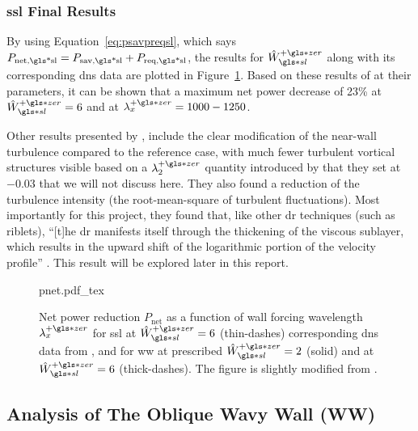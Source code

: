 \subsubsection{\gls*{ssl} Final Results}
By using Equation~\eqref{eq:psavpreqsl}, which says $P_\text{net,\gls*{sl}}=P_\text{sav,\gls*{sl}}+P_\text{req,\gls*{sl}} $, the results for $\hat{W}\pz\ssl$ along with its corresponding \gls*{dns} data are plotted in Figure~\ref{fig:pnet}. Based on these results of \textcite{viotti2009} at their parameters, it can be shown that a maximum net power decrease of 23\% at $\hat{W}\pz\ssl=6$ and at $\lambda_x\pz=1000-1250$.

Other results presented by \textcite{viotti2009}, include the clear modification of the near-wall turbulence compared to the reference case, with much fewer turbulent vortical structures visible based on a $\lambda_2\pz$ quantity introduced by \textcite{jeong1995} that they set at $-0.03$ that we will not discuss here. They also found a reduction of the turbulence intensity (the root-mean-square of turbulent fluctuations). Most importantly for this project, they found that, like other \gls*{dr} techniques (such as riblets), ``[t]he \gls*{dr} manifests itself through the thickening of the viscous sublayer, which results in the upward shift of the logarithmic portion of the velocity profile'' \cite{viotti2009}. This result will be explored later in this report. %

\begin{figure}[htbp]
	\centering
	\def\svgwidth{0.7\textwidth}
	{pnet.pdf_tex}
	\caption[$P_\text{net} $ for SSL and WW as a function of wall forcing wavelength $\lambda_x\pz$]{Net power reduction $P_\text{net}$ as a function of wall forcing wavelength $\lambda_x\pz$ for \gls*{ssl} at $\hat{W}\pz\ssl=6$ (thin-dashes) corresponding \gls*{dns} data from \textcite{viotti2009}, and for \gls*{ww} at prescribed $\hat{W}\pz\ssl=2$ (solid) and at $\hat{W}\pz\ssl=6$ (thick-dashes). The figure is slightly modified from \cite{chernyshenko2013}.} 
	\label{fig:pnet}
\end{figure}

\subsection{Analysis of The Oblique Wavy Wall (WW)}\label{sec:ww}
